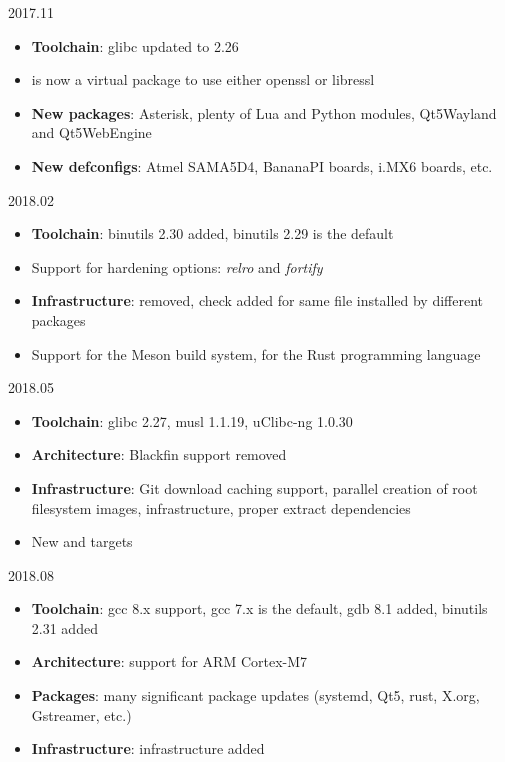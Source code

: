 \begin{frame}{2017.11}
  \begin{itemize}
  \item {\bf Toolchain}: glibc updated to 2.26
  \item {} is now a virtual package to use either openssl
    or libressl
  \item {\bf New packages}: Asterisk, plenty of Lua and Python
    modules, Qt5Wayland and Qt5WebEngine
  \item {\bf New defconfigs}: Atmel SAMA5D4, BananaPI boards, i.MX6
    boards, etc.
  \end{itemize}
\end{frame}

\begin{frame}{2018.02}
  \begin{itemize}
  \item {\bf Toolchain}: binutils 2.30 added, binutils 2.29 is the default
  \item Support for hardening options: {\em relro} and {\em fortify}
  \item {\bf Infrastructure}:  removed, check
    added for same file installed by different packages
  \item Support for the Meson build system, for the Rust programming
    language
  \end{itemize}
\end{frame}

\begin{frame}{2018.05}
  \begin{itemize}
  \item {\bf Toolchain}: glibc 2.27, musl 1.1.19, uClibc-ng 1.0.30
  \item {\bf Architecture}: Blackfin support removed
  \item {\bf Infrastructure}: Git download caching support, parallel
    creation of root filesystem images, 
    infrastructure, proper extract dependencies
  \item New  and
     targets
  \end{itemize}
\end{frame}

\begin{frame}{2018.08}
  \begin{itemize}
  \item {\bf Toolchain}: gcc 8.x support, gcc 7.x is the default, gdb
    8.1 added, binutils 2.31 added
  \item {\bf Architecture}: support for ARM Cortex-M7
  \item {\bf Packages}: many significant package updates (systemd,
    Qt5, rust, X.org, Gstreamer, etc.)
  \item {\bf Infrastructure}:  infrastructure
    added
  \end{itemize}
\end{frame}

